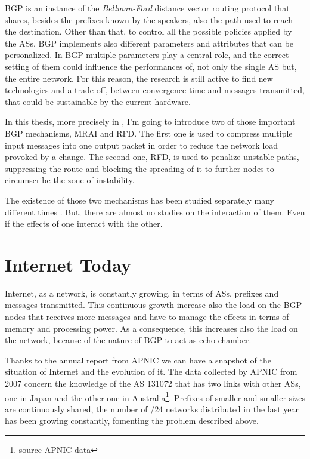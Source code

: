 \ac{BGP} is an instance of the \textit{Bellman-Ford} distance vector routing
protocol that shares, besides the prefixes known by the speakers, also the
path used to reach the destination.
Other than that, to control all the possible policies applied by the \acp{AS},
\ac{BGP} implements also different parameters and attributes that can be
personalized.
In \ac{BGP} multiple parameters play a central role, and the correct setting
of them could influence the performances of, not only the single \ac{AS} but,
the entire network.
For this reason, the research is still active to find new technologies and
a trade-off, between convergence time and messages transmitted, that could
be sustainable by the current hardware.

In this thesis, more precisely in , I'm going to introduce
two of those important \ac{BGP} mechanisms, \ac{MRAI} and \ac{RFD}.
The first one is used to compress multiple input messages into one
output packet in order to reduce the network load provoked by a change.
The second one, \ac{RFD}, is used to penalize unstable paths, suppressing
the route and blocking the spreading of it to further nodes to circumscribe
the zone of instability.

The existence of those two mechanisms has been studied separately many different
times \cite{fabrikant2011there,daggitt2018rate,qiu2005optimal,gray2020bgp}.
But, there are almost no studies on the interaction of them.
Even if the effects of one interact with the other.

\section{Internet Today}
\label{sec:internet_today}

Internet, as a network, is constantly growing, in terms of \acp{AS}, prefixes
and messages transmitted.
This continuous growth increase also the load on the \ac{BGP} nodes that
receives more messages and have to manage the effects in terms of memory
and processing power.
As a consequence, this increases also the load on the network, because of the
nature of \ac{BGP} to act as echo-chamber.

Thanks to the annual report from \ac{APNIC} we can have a snapshot of
the situation of Internet and the evolution of it.
The data collected by \ac{APNIC} from \num{2007} concern the knowledge
of the \ac{AS} 131072 that has two links with other \acp{AS}, one in Japan and
the other one in Australia\footnote{\href{https://blog.apnic.net/2021/01/05/bgp-in-2020-the-bgp-table/}{source APNIC data}}.
Prefixes of smaller and smaller sizes are continuously shared, the number of
$/24$ networks distributed in the last year has been growing constantly,
fomenting the problem described above.

